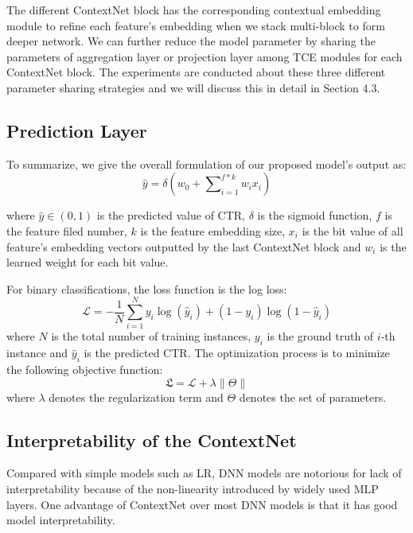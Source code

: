 \documentclass[sigconf]{acmart}
\begin{document}
The different ContextNet block has the corresponding contextual embedding module to refine each feature's embedding when we stack multi-block to form deeper network. We can further reduce the model parameter by sharing the parameters of aggregation layer or projection layer among TCE modules for each ContextNet block. The experiments are conducted about these three different parameter sharing strategies and we will discuss this in detail in Section 4.3.




\subsection{Prediction Layer}
To summarize, we give the overall formulation of our proposed model's output as:
  \begin{equation}
    \hat{y} = \delta(w_0 + \sum\nolimits_{i=1}^{f\ast k}w_ix_i)
  \end{equation}

\noindent where $\hat{y} \in (0, 1)$ is the predicted value of CTR, $\delta$ is the sigmoid function, $f$ is the feature filed number, $k$ is the feature embedding size, $x_i$ is the bit value of all feature's embedding vectors outputted by the last ContextNet block and $w_i$ is the learned weight for each bit value.


For binary classifications, the loss function is the log loss:
\begin{equation}
  \mathcal{L} = -\frac{1}{N}\sum^N_{i=1}y_i\log(\hat{y}_i)+(1-y_i)\log(1-\hat{y}_i)
\end{equation}
where $N$ is the total number of training instances, $y_i$ is the ground truth of $i$-th instance and $\hat{y}_i$ is the predicted CTR. The optimization process is to minimize the following objective function:
\begin{equation}
\mathfrak{L} = \mathcal{L} + \lambda \|\Theta\|
\end{equation}
where $\lambda$ denotes the regularization term and $\Theta$ denotes the set of parameters.

\subsection{Interpretability of  the ContextNet}
Compared with simple models such as LR\cite{10.1145/2487575.2488200}, DNN models are notorious for lack of interpretability because of the non-linearity introduced by widely used MLP layers. One advantage of ContextNet over most DNN models is that it has good model interpretability.
\end{document}
